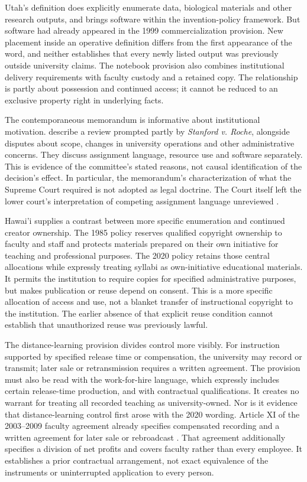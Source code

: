 \documentclass[12pt]{article}
\begin{document}
Utah's definition does explicitly enumerate data, biological materials and other research outputs, and brings software within the invention-policy framework. But software had already appeared in the 1999 commercialization provision. New placement inside an operative definition differs from the first appearance of the word, and neither establishes that every newly listed output was previously outside university claims. The notebook provision also combines institutional delivery requirements with faculty custody and a retained copy. The relationship is partly about possession and continued access; it cannot be reduced to an exclusive property right in underlying facts.

The contemporaneous memorandum is informative about institutional motivation. \citet{prestwich2013} describe a review prompted partly by \textit{Stanford v. Roche}, alongside disputes about scope, changes in university operations and other administrative concerns. They discuss assignment language, resource use and software separately. This is evidence of the committee's stated reasons, not causal identification of the decision's effect. In particular, the memorandum's characterization of what the Supreme Court required is not adopted as legal doctrine. The Court itself left the lower court's interpretation of competing assignment language unreviewed \citep[p. 785 n.2]{roche2011}.

Hawai'i supplies a contrast between more specific enumeration and continued creator ownership. The 1985 policy reserves qualified copyright ownership to faculty and staff and protects materials prepared on their own initiative for teaching and professional purposes. The 2020 policy retains those central allocations while expressly treating syllabi as own-initiative educational materials. It permits the institution to require copies for specified administrative purposes, but makes publication or reuse depend on consent. This is a more specific allocation of access and use, not a blanket transfer of instructional copyright to the institution. The earlier absence of that explicit reuse condition cannot establish that unauthorized reuse was previously lawful.

The distance-learning provision divides control more visibly. For instruction supported by specified release time or compensation, the university may record or transmit; later sale or retransmission requires a written agreement. The provision must also be read with the work-for-hire language, which expressly includes certain release-time production, and with contractual qualifications. It creates no warrant for treating all recorded teaching as university-owned. Nor is it evidence that distance-learning control first arose with the 2020 wording. Article XI of the 2003--2009 faculty agreement already specifies compensated recording and a written agreement for later sale or rebroadcast \citep[pp. 18--19]{hawaiicba2003}. That agreement additionally specifies a division of net profits and covers faculty rather than every employee. It establishes a prior contractual arrangement, not exact equivalence of the instruments or uninterrupted application to every person.
\end{document}
